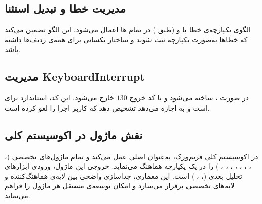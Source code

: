 \subsection{مدیریت خطا و تبدیل استثنا}

الگوی یکپارچه‌ی خطا با  و  (طبق ) در تمام ها اعمال می‌شود. این الگو تضمین می‌کند که خطاها به‌صورت یکپارچه ثبت شوند و  ساختار یکسانی برای همه‌ی ردیف‌ها داشته باشد.

\subsection{مدیریت KeyboardInterrupt}

در صورت ،  ساخته می‌شود و با کد خروج $130$ خارج می‌شود. این کد، استاندارد  برای  است و به  اجازه می‌دهد تشخیص دهد که کاربر اجرا را لغو کرده است.

\subsection{نقش ماژول در اکوسیستم کلی}

در اکوسیستم کلی فریم‌ورک،  به‌عنوان  اصلی عمل می‌کند و تمام ماژول‌های تخصصی (، ، ، ، ، ، ، ، ) را در یک  یکپارچه هماهنگ می‌نماید. خروجی  این ماژول، ورودی ابزارهای تحلیل بعدی (، ، ) است. این معماری، جداسازی واضحی بین لایه‌ی هماهنگ‌کننده و لایه‌های تخصصی برقرار می‌سازد و امکان توسعه‌ی مستقل هر ماژول را فراهم می‌نماید.
